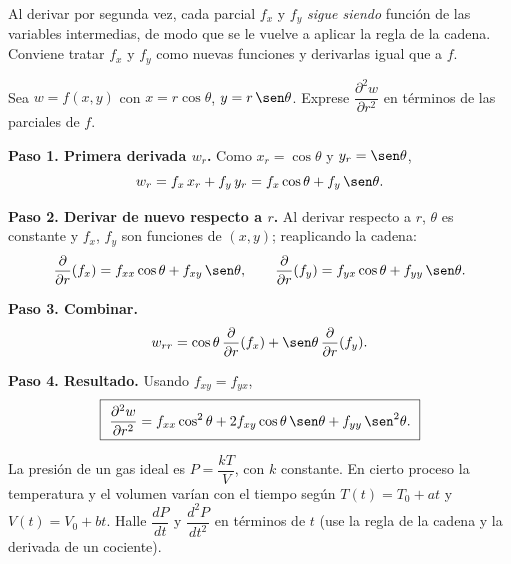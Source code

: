 \begin{rem}
Al derivar por segunda vez, cada parcial $f_x$ y $f_y$ \emph{sigue siendo}
función de las variables intermedias, de modo que se le vuelve a aplicar la
regla de la cadena. Conviene tratar $f_x$ y $f_y$ como nuevas funciones y
derivarlas igual que a $f$.
\end{rem}

\begin{prob}
Sea $w=f(x,y)$ con $x=r\cos\theta$, $y=r\,\sen\theta$. Exprese
$\dfrac{\partial^2 w}{\partial r^2}$ en términos de las parciales de $f$.
\begin{myproof}
\textbf{Paso 1. Primera derivada $w_r$.}
Como $x_r=\cos\theta$ y $y_r=\sen\theta$,
\[
  w_r=f_x\,x_r+f_y\,y_r=f_x\cos\theta+f_y\,\sen\theta.
\]

\textbf{Paso 2. Derivar de nuevo respecto a $r$.}
Al derivar respecto a $r$, $\theta$ es constante y $f_x$, $f_y$ son funciones
de $(x,y)$; reaplicando la cadena:
\[
  \frac{\partial}{\partial r}(f_x)=f_{xx}\cos\theta+f_{xy}\,\sen\theta,\qquad
  \frac{\partial}{\partial r}(f_y)=f_{yx}\cos\theta+f_{yy}\,\sen\theta.
\]

\textbf{Paso 3. Combinar.}
\[
  w_{rr}=\cos\theta\,\frac{\partial}{\partial r}(f_x)
        +\sen\theta\,\frac{\partial}{\partial r}(f_y).
\]

\textbf{Paso 4. Resultado.}
Usando $f_{xy}=f_{yx}$,
\[
  \boxed{\ \frac{\partial^2 w}{\partial r^2}
  =f_{xx}\cos^2\theta+2f_{xy}\cos\theta\,\sen\theta+f_{yy}\,\sen^2\theta.\ }
\]
\end{myproof}
\end{prob}

\begin{prob}
La presión de un gas ideal es $P=\dfrac{kT}{V}$, con $k$ constante. En cierto
proceso la temperatura y el volumen varían con el tiempo según $T(t)=T_0+at$ y
$V(t)=V_0+bt$. Halle $\dfrac{dP}{dt}$ y $\dfrac{d^2P}{dt^2}$ en términos de
$t$ (use la regla de la cadena y la derivada de un cociente).
\end{prob}





